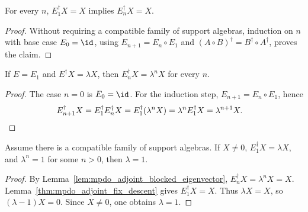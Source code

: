 \begin{lemma}%
    \label{lem:mpdo_adjoint_fix_reverse}
    \leanok
    For every $n$, $E_1^{\dagger}X=X$ implies $E_n^{\dagger}X=X$.
\end{lemma}
\begin{proof}\leanok
    Without requiring a compatible family of support algebras, induction on
    $n$ with base case $E_0 = \id$, using $E_{n+1} = E_n \circ E_1$ and
    $(A \circ B)^{\dagger} = B^{\dagger} \circ A^{\dagger}$, proves the
    claim.
\end{proof}

\begin{lemma}%
    \label{lem:mpdo_adjoint_blocked_eigenvector}
    \leanok
    If $E=E_1$ and $E^\dagger X=\lambda X$, then
    $E_n^\dagger X=\lambda^n X$ for every $n$.
\end{lemma}
\begin{proof}\leanok
    The case $n=0$ is $E_0=\id$. For the induction step,
    $E_{n+1}=E_n\circ E_1$, hence
    \begin{align}
        E_{n+1}^{\dagger}X
         & = E_1^{\dagger}E_n^{\dagger}X
        = E_1^{\dagger}(\lambda^n X)
        = \lambda^n E_1^{\dagger}X
        = \lambda^{n+1}X.
        \notag
    \end{align}
\end{proof}

\begin{lemma}%
    \label{thm:mpdo_algebra_root_of_unity_eigenvalue}
    \leanok
    Assume there is a compatible family of support algebras. If $X\ne 0$,
    $E_1^\dagger X=\lambda X$, and $\lambda^n=1$ for some $n>0$, then
    $\lambda=1$.
\end{lemma}
\begin{proof}\leanok
    By Lemma~\ref{lem:mpdo_adjoint_blocked_eigenvector},
    $E_n^\dagger X=\lambda^n X=X$. Lemma~\ref{thm:mpdo_adjoint_fix_descent} gives
    $E_1^\dagger X=X$. Thus $\lambda X=X$, so $(\lambda-1)X=0$. Since
    $X\ne0$, one obtains $\lambda=1$.
\end{proof}

